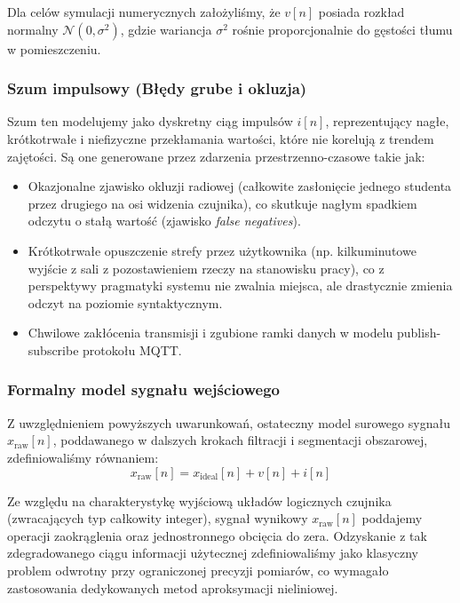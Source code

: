 \documentclass[14pt,a4paper]{extarticle}
\begin{document}
Dla celów symulacji numerycznych założyliśmy, że $v[n]$ posiada rozkład normalny $\mathcal{N}(0, \sigma^2)$, gdzie wariancja $\sigma^2$ rośnie proporcjonalnie do gęstości tłumu w pomieszczeniu.

\subsubsection*{Szum impulsowy (Błędy grube i okluzja)}
Szum ten modelujemy jako dyskretny ciąg impulsów $i[n]$, reprezentujący nagłe, krótkotrwałe i niefizyczne przekłamania wartości, które nie korelują z trendem zajętości. Są one generowane przez zdarzenia przestrzenno-czasowe takie jak:
\begin{itemize}
    \item Okazjonalne zjawisko okluzji radiowej (całkowite zasłonięcie jednego studenta przez drugiego na osi widzenia czujnika), co skutkuje nagłym spadkiem odczytu o stałą wartość (zjawisko \textit{false negatives}).
    \item Krótkotrwałe opuszczenie strefy przez użytkownika (np. kilkuminutowe wyjście z sali z pozostawieniem rzeczy na stanowisku pracy), co z perspektywy pragmatyki systemu nie zwalnia miejsca, ale drastycznie zmienia odczyt na poziomie syntaktycznym.
    \item Chwilowe zakłócenia transmisji i zgubione ramki danych w modelu publish-subscribe protokołu MQTT.
\end{itemize}

\subsubsection*{Formalny model sygnału wejściowego}
Z uwzględnieniem powyższych uwarunkowań, ostateczny model surowego sygnału $x_{\text{raw}}[n]$, poddawanego w dalszych krokach filtracji i segmentacji obszarowej, zdefiniowaliśmy równaniem:
\begin{equation}
x_{\text{raw}}[n] = x_{\text{ideal}}[n] + v[n] + i[n]
\end{equation}

Ze względu na charakterystykę wyjściową układów logicznych czujnika (zwracających typ całkowity integer), sygnał wynikowy $x_{\text{raw}}[n]$ poddajemy operacji zaokrąglenia oraz jednostronnego obcięcia do zera. Odzyskanie z tak zdegradowanego ciągu informacji użytecznej zdefiniowaliśmy jako klasyczny problem odwrotny przy ograniczonej precyzji pomiarów, co wymagało zastosowania dedykowanych metod aproksymacji nieliniowej.
\end{document}
